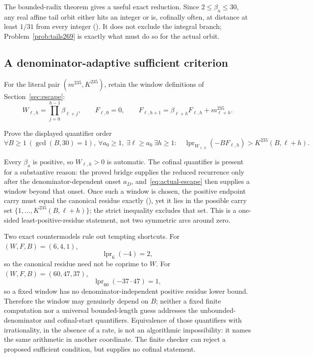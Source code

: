 The bounded-radix theorem gives a useful exact reduction.  Since
$2\le\beta_a\le30$, any real affine tail orbit either hits an integer or is,
cofinally often, at distance at least $1/31$ from every integer
().
It does not exclude the integral branch; Problem~\ref{prob:tails269} is exactly
what must do so for the actual orbit.

\subsection{A denominator-adaptive sufficient criterion}

For the literal pair $(m^{235},K^{235})$, retain the window definitions of
Section~\ref{sec:escape}:
\[
 W_{\ell,h}=\prod_{j=0}^{h-1}\beta_{\ell+j},\qquad
 F_{\ell,0}=0,\qquad
 F_{\ell,h+1}=\beta_{\ell+h}F_{\ell,h}+m_{\ell+h}^{235}.
\]

\begin{problem}\label{prob:producer}
Prove the displayed quantifier order
\[
 \forall B\ge1\ (\gcd(B,30)=1),\ \forall a_0\ge1,\
 \exists\ell\ge a_0\ \exists h\ge1:\quad
 \operatorname{lpr}_{W_{\ell,h}}(-BF_{\ell,h})
   >K^{235}(B,\ell+h).
\tag{9.5}\label{eq:actual-escape}
\]
\end{problem}

Every $\beta_a$ is positive, so $W_{\ell,h}>0$ is automatic.  The cofinal
quantifier is present for a substantive reason: the proved bridge supplies
the reduced recurrence only after the denominator-dependent onset $a_D$,
and~\eqref{eq:actual-escape} then supplies a window beyond that onset.
Once such a window is chosen, the positive endpoint carry must equal the
canonical residue exactly
(),
yet it lies in the possible carry set
$\{1,\ldots,K^{235}(B,\ell+h)\}$; the strict inequality excludes that set.
This is a one-sided least-positive-residue statement, not two symmetric arcs
around zero.

Two exact countermodels rule out tempting shortcuts.  For $(W,F,B)=(6,4,1)$,
\[
 \operatorname{lpr}_{6}(-4)=2,
\]
so the canonical residue need not be coprime to $W$.  For
$(W,F,B)=(60,47,37)$,
\[
 \operatorname{lpr}_{60}(-37\cdot47)=1,
\]
so a fixed window has no denominator-independent positive residue lower
bound.  Therefore the window may genuinely depend on $B$; neither a fixed
finite computation nor a universal bounded-length guess addresses the
unbounded-denominator and cofinal-start quantifiers.  Equivalence of those
quantifiers with irrationality, in the absence of a rate, is not an
algorithmic impossibility: it names the same arithmetic in another
coordinate.  The finite checker can reject a proposed sufficient condition,
but supplies no cofinal statement.


